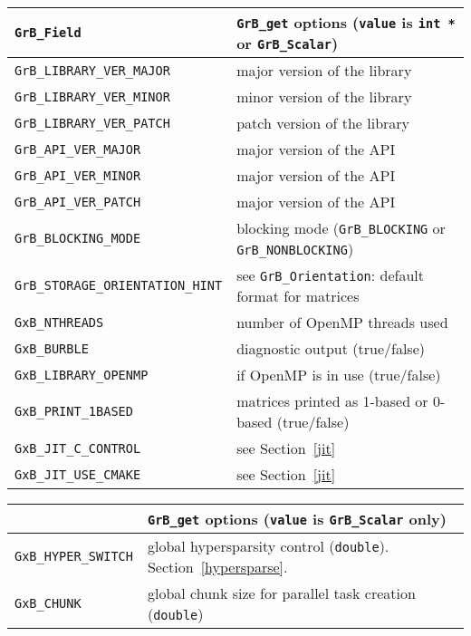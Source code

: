 \vspace{0.1in}
\noindent
{\small
\begin{tabular}{p{2.2in}p{3.5in}}
\hline
\verb'GrB_Field'                    & \verb'GrB_get' options (\verb'value' is \verb'int *' or \verb'GrB_Scalar') \\
\hline
\verb'GrB_LIBRARY_VER_MAJOR'        & major version of the library \\
\verb'GrB_LIBRARY_VER_MINOR'        & minor version of the library \\
\verb'GrB_LIBRARY_VER_PATCH'        & patch version of the library \\
\verb'GrB_API_VER_MAJOR'            & major version of the API \\
\verb'GrB_API_VER_MINOR'            & major version of the API \\
\verb'GrB_API_VER_PATCH'            & major version of the API \\
\verb'GrB_BLOCKING_MODE'            & blocking mode (\verb'GrB_BLOCKING' or \verb'GrB_NONBLOCKING') \\
\verb'GrB_STORAGE_ORIENTATION_HINT' & see \verb'GrB_Orientation': default format for matrices \\
\hline
\verb'GxB_NTHREADS'                 & number of OpenMP threads used \\
\verb'GxB_BURBLE'                   & diagnostic output (true/false) \\
\verb'GxB_LIBRARY_OPENMP'           & if OpenMP is in use (true/false) \\
\verb'GxB_PRINT_1BASED'             & matrices printed as 1-based or 0-based (true/false) \\
\verb'GxB_JIT_C_CONTROL'            & see Section~\ref{jit} \\
\verb'GxB_JIT_USE_CMAKE'            & see Section~\ref{jit} \\
\hline
\end{tabular}
}
\vspace{0.05in}

\noindent
{\small
\begin{tabular}{p{2.2in}p{3.5in}}
\hline
                                    & \verb'GrB_get' options (\verb'value' is \verb'GrB_Scalar' only) \\
\hline
\verb'GxB_HYPER_SWITCH'             & global hypersparsity control (\verb'double').
                                        Section~\ref{hypersparse}. \\
\verb'GxB_CHUNK'                    & global chunk size for parallel task creation (\verb'double') \\
\hline
\end{tabular}
}
\vspace{0.05in}

